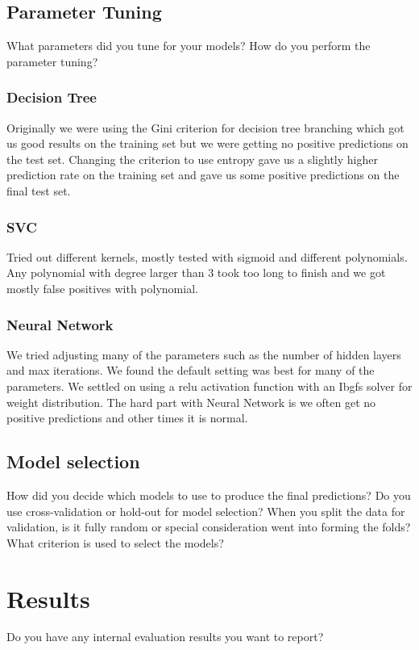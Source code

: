\documentclass[11pt,a4paper]{article}
\begin{document}
\subsection{Parameter Tuning}
What parameters did you tune for your models? How do you perform the parameter tuning?

\subsubsection{Decision Tree}
Originally we were using the Gini criterion for decision tree branching which got us good results on the training set but we were getting no positive predictions on the test set.
Changing the criterion to use entropy gave us a slightly higher prediction rate on the training set and gave us some positive predictions on the final test set.

\subsubsection{SVC}
Tried out different kernels, mostly tested with sigmoid and different polynomials.
Any polynomial with degree larger than 3 took too long to finish and we got mostly false positives with polynomial.

\subsubsection{Neural Network}
We tried adjusting many of the parameters such as the number of hidden layers and max iterations.
We found the default setting was best for many of the parameters.
We settled on using a relu activation function with an Ibgfs solver for weight distribution.
The hard part with Neural Network is we often get no positive predictions and other times it is normal.

\subsection{Model selection}
How did you decide which models to use to produce the final predictions?  Do you use cross-validation or hold-out for model selection? When you split the data for validation, is it fully random or special consideration went into forming the folds? What criterion is used to select the models?

\section{Results}
Do you have any internal evaluation results you want to report?
\end{document}
